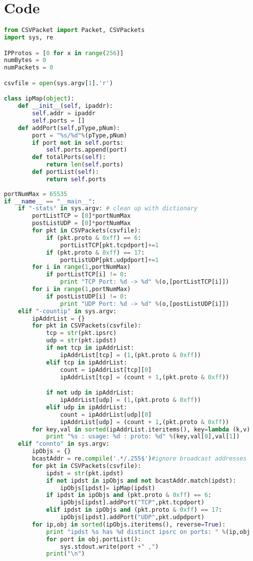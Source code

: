 \documentclass[letterpaper,12pt,titlepage,onecolumn]{IEEEtran}
\begin{document}
\section{Code}
\begin{lstlisting}[language=Python]
from CSVPacket import Packet, CSVPackets
import sys, re

IPProtos = [0 for x in range(256)]
numBytes = 0
numPackets = 0

csvfile = open(sys.argv[1].'r')

class ipMap(object):
    def __init__(self, ipaddr):
        self.addr = ipaddr
        self.ports = []
    def addPort(self,pType,pNum):
        port = "%s/%d"%(pType,pNum)
        if port not in self.ports:
            self.ports.append(port)
        def totalPorts(self):
            return len(self.ports)
        def portList(self):
            return self.ports
        
portNumMax = 65535
if __name__ == "__main__":
    if "-stats" in sys.argv: # clean up with dictionary
        portListTCP = [0]*portNumMax
        postListUDP = [0]*portNumMax
        for pkt in CSVPackets(csvfile):
            if (pkt.proto & 0xff) == 6:
                portListTCP[pkt.tcpdport]+=1
            if (pkt.proto & 0xff) == 17:
                portListUDP[pkt.udpdport]+=1
        for i in range(1,portNumMax)
            if portListTCP[i] != 0:
                print "TCP Port: %d -> %d" %(o,[portListTCP[i]])
        for i in range(1,portNumMax)
            if postListUDP[i] != 0:
                print "UDP Port: %d -> %d" %(o,[postListUDP[i]])
    elif "-countip" in sys.argv:
        ipAddrList = {}
        for pkt in CSVPackets(csvfile):
            tcp = str(pkt.ipsrc)
            udp = str(pkt.ipdst)
            if not tcp in ipAddrList:
                ipAddrList[tcp] = (1,(pkt.proto & 0xff))
            elif tcp in ipAddrList:
                count = ipAddrList[tcp][0]
                ipAddrList[tcp] = (count + 1,(pkt.proto & 0xff))

            if not udp in ipAddrList:
                ipAddrList[udp] = (1,(pkt.proto & 0xff))
            elif udp in ipAddrList:
                count = ipAddrList[udp][0]
                ipAddrList[udp] = (count + 1,(pkt.proto & 0xff))
        for key,val in sorted(ipAddrList.iteritems(), key=lambda (k,v): (v,k), reverse=True):
            print "%s : usage: %d : proto: %d" %(key,val[0],val[1])
    elif "connto" in sys.argv:
        ipObjs = {}
        bcastAddr = re.compile('.*/.255$')#ignore broadcast addresses
        for pkt in CSVPackets(csvfile):
            ipdst = str(pkt.ipdst)
            if not ipdst in ipObjs and not bcastAddr.match(ipdst):
                ipObjs[ipdst]= ipMap(ipdst)
            if ipdst in ipObjs and (pkt.proto & 0xff) == 6:
                ipObjs[ipdst].addPort("TCP",pkt.tcpdport)
            elif ipdst in ipObjs and (pkt.proto & 0xff) == 17:
                ipObjs[ipdst].addPort("UDP",pkt.udpdport)
        for ip,obj in sorted(ipObjs.iteritems(), reverse=True):
            print "ipdst %s has %d distinct ipsrc on ports: " %(ip,obj.totalPorts)
            for port in obj.portList():
                sys.stdout.write(port +" ,")
            print("\n")
                
\end{lstlisting}
\end{document}
